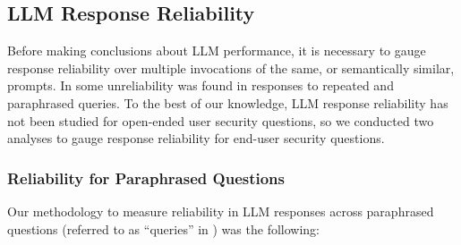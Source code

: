 \subsection{LLM Response Reliability}
\label{sec:reproducibility}

Before making conclusions about LLM performance, it is necessary to gauge response reliability over multiple invocations of the same, or semantically similar, prompts. In \cite{chen2023can} some unreliability was found in responses to repeated and paraphrased queries. To the best of our knowledge, LLM response reliability has not been studied for open-ended user security questions, so we conducted two analyses to gauge response reliability for end-user security questions. 





\subsubsection{Reliability for Paraphrased Questions} \label{appendix-prompt-sensitivity}

Our methodology to measure reliability in LLM responses across paraphrased questions (referred to as ``queries'' in \cite{chen2023can}) was the following:

